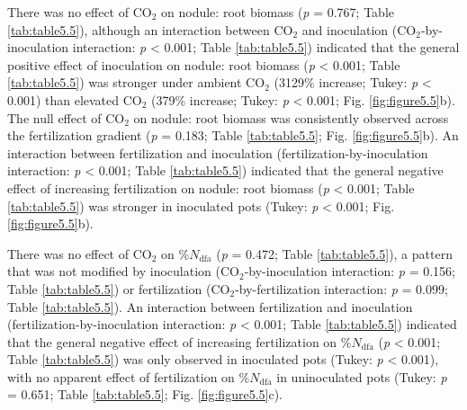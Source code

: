There was no effect of CO$_2$ on nodule: root biomass (\textit{p} = 0.767; Table \ref{tab:table5.5}), although an interaction between CO$_2$ and inoculation (CO$_2$-by-inoculation interaction: \textit{p} < 0.001; Table \ref{tab:table5.5}) indicated that the general positive effect of inoculation on nodule: root biomass (\textit{p} < 0.001; Table \ref{tab:table5.5}) was stronger under ambient CO$_2$ (3129\% increase; Tukey: \textit{p} < 0.001) than elevated CO$_2$ (379\% increase; Tukey: \textit{p} < 0.001; Fig. \ref{fig:figure5.5}b). The null effect of CO$_2$ on nodule: root biomass was consistently observed across the fertilization gradient (\textit{p} = 0.183; Table \ref{tab:table5.5}; Fig. \ref{fig:figure5.5}b). An interaction between fertilization and inoculation (fertilization-by-inoculation interaction: \textit{p} < 0.001; Table \ref{tab:table5.5}) indicated that the general negative effect of increasing fertilization on nodule: root biomass (\textit{p} < 0.001; Table \ref{tab:table5.5}) was stronger in inoculated pots (Tukey: \textit{p} < 0.001; Fig. \ref{fig:figure5.5}b). 

There was no effect of CO$_2$ on \%$N_\mathrm{dfa}$ (\textit{p} = 0.472; Table \ref{tab:table5.5}), a pattern that was not modified by inoculation (CO$_2$-by-inoculation interaction: \textit{p} = 0.156; Table \ref{tab:table5.5}) or fertilization (CO$_2$-by-fertilization interaction: \textit{p} = 0.099; Table \ref{tab:table5.5}). An interaction between fertilization and inoculation (fertilization-by-inoculation interaction: \textit{p} < 0.001; Table \ref{tab:table5.5}) indicated that the general negative effect of increasing fertilization on \%$N_\mathrm{dfa}$ (\textit{p} < 0.001; Table \ref{tab:table5.5}) was only observed in inoculated pots (Tukey: \textit{p} < 0.001), with no apparent effect of fertilization on \%$N_\mathrm{dfa}$ in uninoculated pots (Tukey: \textit{p} = 0.651; Table \ref{tab:table5.5}; Fig. \ref{fig:figure5.5}c).

